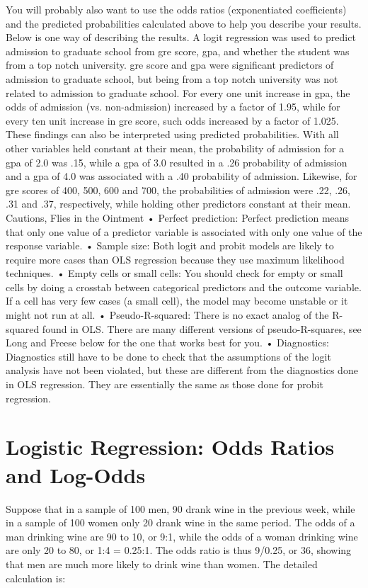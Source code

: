 You will probably also want to use the odds ratios (exponentiated coefficients) and the predicted probabilities calculated above to help  you describe your results. Below is one way of describing the results. 
A logit regression was used to predict admission to graduate school from gre score, gpa, and whether the student was from a top notch university. gre score and gpa were significant predictors of admission to graduate school, but being from a top notch university was not related to admission to graduate school. For every one unit increase in gpa, the odds of admission (vs. non-admission) increased by a factor of 1.95, while for every ten unit increase in gre score, such odds increased by a factor of 1.025. These findings can also be interpreted using predicted probabilities. With all other variables held constant at their mean, the probability of admission for a gpa of 2.0 was .15, while a gpa of 3.0 resulted in a .26 probability of admission and a gpa of 4.0 was associated with a .40 probability of admission. Likewise, for gre scores of 400, 500, 600 and 700, the probabilities of admission were .22, .26, .31 and .37, respectively, while holding other predictors constant at their mean.
Cautions, Flies in the Ointment
•	Perfect prediction:  Perfect prediction means that only one value of a predictor variable is associated with only one value of the response variable.  
•	Sample size:  Both logit and probit models are likely to require more cases than OLS regression because they use maximum likelihood techniques. 
•	Empty cells or small cells:  You should check for empty or small cells by doing a crosstab between categorical predictors and the outcome variable.  If a cell has very few cases (a small cell), the model may become unstable or it might not run at all. 
•	Pseudo-R-squared:  There is no exact analog of the R-squared found in OLS.  There are many different versions of pseudo-R-squares, see Long and Freese below for the one that works best for you. 
•	Diagnostics:  Diagnostics still have to be done to check that the assumptions of the logit analysis have not been violated, but these are different from the diagnostics done in OLS regression.  They are essentially the same as those done for probit regression.




\newpage
\section{Logistic Regression: Odds Ratios and Log-Odds}
Suppose that in a sample of 100 men, 90 drank wine in the previous week, while in a sample of 100 women only 20 drank wine in the same period. The odds of a man drinking wine are 90 to 10, or 9:1, while the odds of a woman drinking wine are only 20 to 80, or 1:4 = 0.25:1. The odds ratio is thus 9/0.25, or 36, showing that men are much more likely to drink wine than women. The detailed calculation is:

